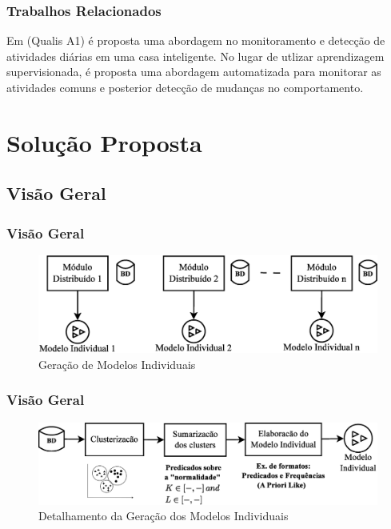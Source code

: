 \documentclass[hyperref={pdfpagelabels=false}]{beamer}
\begin{document}
\begin{frame}
	\frametitle{Trabalhos Relacionados}
    
    Em \cite{000-062} (Qualis A1) é proposta uma abordagem no monitoramento e detecção de atividades diárias em uma casa inteligente.
    \linebreak \linebreak
    No lugar de utlizar aprendizagem supervisionada, é proposta uma abordagem automatizada para monitorar as atividades comuns e posterior detecção de mudanças no comportamento.
\end{frame}

\section{Solução Proposta}

\subsection{Visão Geral}  

\begin{frame}
	\frametitle{Visão Geral}
    \begin{figure}
		\centering
	    \includegraphics[scale=0.35]{img/VisaoGeral-00}
  		\caption{\scriptsize{Geração de Modelos Individuais}}
   	\end{figure}

\end{frame}

\begin{frame}
	\frametitle{Visão Geral}
    \begin{figure}
		\centering
	    \includegraphics[scale=0.30]{img/VisaoGeral-01}
  		\caption{\scriptsize{Detalhamento da Geração dos Modelos Individuais}}
   	\end{figure}
\end{frame}
\end{document}
